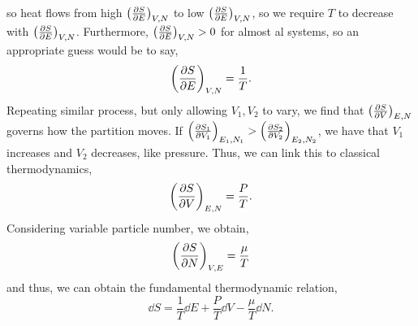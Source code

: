 \documentclass{book}
\begin{document}
so heat flows from high $\left(\pdv{S}{E}\right)_{V,N}$  to low $\left(\pdv{S}{E}\right)_{V,N}$, so we require $T$ to decrease with $\left(\pdv{S}{E}\right)_{V,N}$. Furthermore, $\left(\pdv{S}{E}\right)_{V,N} > 0$ for almost al systems, so an appropriate guess would be to say,
\begin{equation}
	\left(\pdv{S}{E}\right)_{V,N} = \frac{1}{T}. \label{eq:1/T}
\end{equation}
Repeating similar process, but only allowing $V_1, V_2$ to vary, we find that $\left(\pdv{S}{V}\right)_{E,N}$ governs how the partition moves. If $\left(\pdv{S_1}{V_1}\right)_{E_1,N_1} > \left(\pdv{S_2}{V_2}\right)_{E_2,N_2}$, we have that $V_1$ increases and $V_2$ decreases, like pressure. Thus, we can link this to classical thermodynamics,
\begin{equation}
	\left(\pdv{S}{V}\right)_{E,N} = \frac{P}{T}.
\end{equation}
Considering variable particle number, we obtain,
\begin{equation}
	\left(\pdv{S}{N}\right)_{V,E} = \frac{\mu}{T}
\end{equation}
and thus, we can obtain the fundamental thermodynamic relation,
\begin{equation}
	\dd{S} = \frac{1}{T}\dd{E} + \frac{P}{T}\dd{V} - \frac{\mu}{T}\dd{N}.
	\end{equation}
\end{document}

